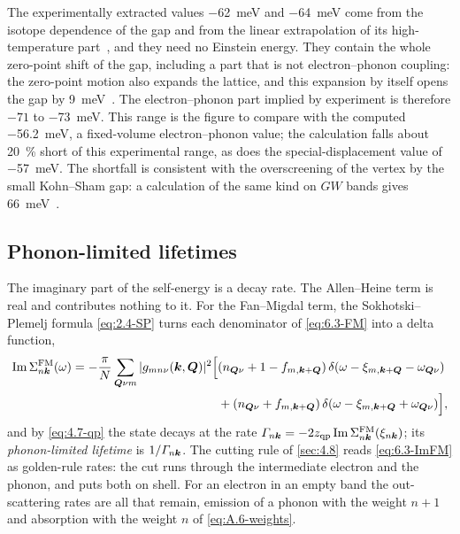 The experimentally extracted values \SI{-62}{meV} and \SI{-64}{meV} come from the isotope dependence of the gap and from the linear extrapolation of its high-temperature part~\cite{cardona2005electron}, and they need no Einstein energy. They contain the whole zero-point shift of the gap, including a part that is not electron--phonon coupling: the zero-point motion also expands the lattice, and this expansion by itself opens the gap by \SI{9}{meV}~\cite[Table~S2]{miglio2020predominance}. The electron--phonon part implied by experiment is therefore $-71$ to \SI{-73}{meV}. This range is the figure to compare with the computed \SI{-56.2}{meV}, a fixed-volume electron--phonon value; the calculation falls about \SI{20}{\percent} short of this experimental range, as does the special-displacement value of \SI{-57}{meV}. The shortfall is consistent with the overscreening of the vertex by the small Kohn--Sham gap: a calculation of the same kind on $GW$ bands gives \SI{66}{meV}~\cite[Sect.~VII\,B]{zacharias2020theory}.

\subsection{Phonon-limited lifetimes}

The imaginary part of the self-energy is a decay rate. The Allen--Heine term is real and contributes nothing to it. For the Fan--Migdal term, the Sokhotski--Plemelj formula \cref{eq:2.4-SP} turns each denominator of \cref{eq:6.3-FM} into a delta function,
\begin{equation}
  \begin{aligned}
  \operatorname{Im}\Sigma^{\mathrm{FM}}_{n\bm{k}}(\omega) = -\frac{\pi}{N}\sum_{\bm{Q}\nu m}|g_{mn\nu}(\bm{k},\bm{Q})|^2
  \Bigl[&(n_{\bm{Q}\nu} + 1 - f_{m,\bm{k}+\bm{Q}})\,\delta(\omega - \xi_{m,\bm{k}+\bm{Q}} - \omega_{\bm{Q}\nu}) \\
  &+ (n_{\bm{Q}\nu} + f_{m,\bm{k}+\bm{Q}})\,\delta(\omega - \xi_{m,\bm{k}+\bm{Q}} + \omega_{\bm{Q}\nu})\Bigr] ,
  \end{aligned}
  \label{eq:6.3-ImFM}
\end{equation}
and by \cref{eq:4.7-qp} the state decays at the rate $\varGamma_{n\bm{k}} = -2z_{\mathrm{qp}}\operatorname{Im}\Sigma^{\mathrm{FM}}_{n\bm{k}}(\xi_{n\bm{k}})$; its \emph{phonon-limited lifetime} is $1/\varGamma_{n\bm{k}}$. The cutting rule of \cref{sec:4.8} reads \cref{eq:6.3-ImFM} as golden-rule rates: the cut runs through the intermediate electron and the phonon, and puts both on shell. For an electron in an empty band the out-scattering rates are all that remain, emission of a phonon with the weight $n + 1$ and absorption with the weight $n$ of \cref{eq:A.6-weights}.

